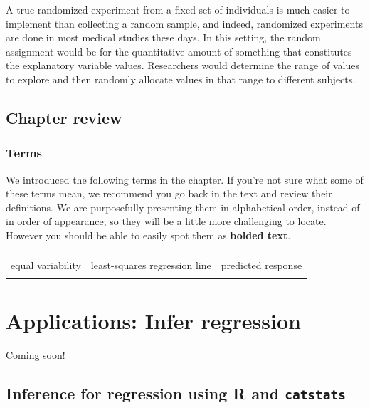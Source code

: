 \documentclass[
  10pt,
  openany]{book}
\theoremstyle{definition}
\theoremstyle{definition}
\theoremstyle{definition}
\theoremstyle{definition}
\theoremstyle{remark}
\begin{document}
A true randomized experiment from a fixed set of individuals is much easier to implement than collecting a random sample, and indeed, randomized experiments are done in most medical studies these days. In this setting, the random assignment would be for the quantitative amount of something that constitutes the explanatory variable values. Researchers would determine the range of values to explore and then randomly allocate values in that range to different subjects.

\section{Chapter review}\label{chp21-review}

\subsection*{Terms}\label{terms-16}

We introduced the following terms in the chapter. If you're not sure what some of these terms mean, we recommend you go back in the text and review their definitions. We are purposefully presenting them in alphabetical order, instead of in order of appearance, so they will be a little more challenging to locate. However you should be able to easily spot them as \textbf{bolded text}.

\begin{tabu} to 
\toprule
{} &  & \\
equal variability & least-squares regression line & predicted response\\
 &  & \\
\bottomrule
\end{tabu}

\chapter{Applications: Infer regression}\label{inference-reg-applications}

Coming soon!

\section{\texorpdfstring{Inference for regression using R and \texttt{catstats}}{Inference for regression using R and catstats}}\label{inference-for-regression-using-r-and-catstats}
\end{document}
